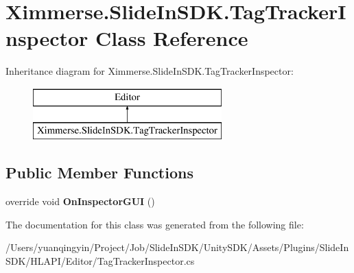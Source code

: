 \hypertarget{class_ximmerse_1_1_slide_in_s_d_k_1_1_tag_tracker_inspector}{}\section{Ximmerse.\+Slide\+In\+S\+D\+K.\+Tag\+Tracker\+Inspector Class Reference}
\label{class_ximmerse_1_1_slide_in_s_d_k_1_1_tag_tracker_inspector}
Inheritance diagram for Ximmerse.\+Slide\+In\+S\+D\+K.\+Tag\+Tracker\+Inspector\+:\begin{figure}[H]
\begin{center}
\leavevmode
\includegraphics[height=2.000000cm]{class_ximmerse_1_1_slide_in_s_d_k_1_1_tag_tracker_inspector}
\end{center}
\end{figure}
\subsection*{Public Member Functions}
\begin{DoxyCompactItemize}
\item 
\mbox{\label{class_ximmerse_1_1_slide_in_s_d_k_1_1_tag_tracker_inspector_a1d0542a1541afdd9b2a685077f933ab5}} 
override void {\bfseries On\+Inspector\+G\+UI} ()
\end{DoxyCompactItemize}


The documentation for this class was generated from the following file\+:\begin{DoxyCompactItemize}
\item 
/\+Users/yuanqingyin/\+Project/\+Job/\+Slide\+In\+S\+D\+K/\+Unity\+S\+D\+K/\+Assets/\+Plugins/\+Slide\+In\+S\+D\+K/\+H\+L\+A\+P\+I/\+Editor/Tag\+Tracker\+Inspector.\+cs\end{DoxyCompactItemize}
